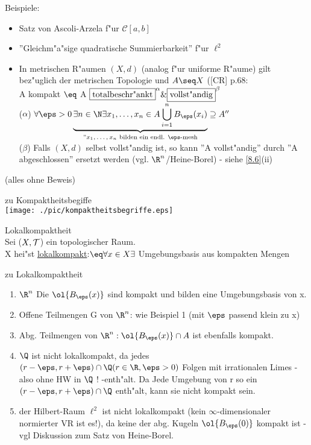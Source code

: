 Beispiele:
\begin{itemize}
\item Satz von {\sc Ascoli-Arzela} f"ur $\mathcal{C}[a,b]$
\item ''Gleichm"a"sige quadratische Summierbarkeit'' f"ur $\ell^2$
\item In metrischen R"aumen $(X,d)$ (analog f"ur uniforme R"aume) gilt bez"uglich der metrischen Topologie und $A\seq X$ ([CR] p.68:\\
A kompakt $\eq$ A $\framebox{totalbeschr"ankt}^\alpha \& \framebox{vollst"andig}^\beta$\\
($\alpha$) $\forall \eps >0\underbrace{\exists n\in\N\exists x_1,\dots ,x_n\in A\bigcup_{i=1}^n B_\eps(x_i)}_{\mbox{\scriptsize ''$x_1,\dots ,x_n$ bilden ein endl. $\eps$-mesh}}\supseteq A''$\\
($\beta$) Falls $(X,d)$ selbst vollst"andig ist, so kann ''A vollst"andig'' durch ''A abgeschlossen'' ersetzt werden (vgl. $\R^n$/{\sc Heine-Borel}) - siehe \ref{8.6}(ii)
\end{itemize}
(alles ohne Beweis)
\begin{beob}\label{6.15} zu Kompaktheitsbegiffe\\
\texttt{[image: ./pic/kompaktheitsbegriffe.eps]}
\end{beob}

\begin{definition}\label{6.16}Lokalkompaktheit\\
Sei ($X,\mathcal T$) ein topologischer Raum.\\
X hei"st \ul{lokalkompakt}:$\eq\forall x\in X\exists$ Umgebungsbasis aus kompakten Mengen
\end{definition}

\begin{beispiel}\label{6.17}zu Lokalkompaktheit
\begin{enumerate}
\item $\R^n$ Die $\ol{B_\eps(x)}$ sind kompakt und bilden eine Umgebungsbasis von x.
\item Offene Teilmengen G von $\R^n$: wie Beispiel 1 (mit $\eps$ passend klein zu x)
\item Abg. Teilmengen von $\R^n: \ol{B_\eps(x)}\cap A$ ist ebenfalls kompakt.
\item $\Q$ ist nicht lokalkompakt, da jedes $(r-\eps ,r+\eps )\cap\Q (r\in\R ,\eps >0)$ Folgen mit irrationalen Limes - also ohne HW in $\Q$ ! -enth"alt. Da Jede Umgebung von r so ein $(r-\eps ,r+\eps )\cap\Q$ enth"alt, kann sie nicht kompakt sein.
\item der {\sc Hilbert}-Raum $\ell^2$ ist nicht lokalkompakt (kein $\infty$-dimensionaler normierter VR ist es!), da keine der abg. Kugeln $\ol{B_\eps(0)}$ kompakt ist - vgl Diskussion zum Satz von {\sc Heine-Borel}.
\end{enumerate}
\end{beispiel}

